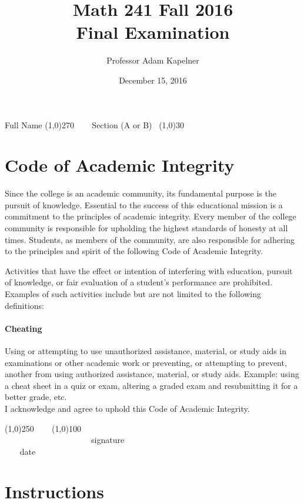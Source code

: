 \documentclass[12pt]{article}
\title{Math 241 Fall 2016 \\ Final Examination}
\author{Professor Adam Kapelner}
\date{December 15, 2016}
\begin{document}
\maketitle

\noindent Full Name \line(1,0){270} ~~~ Section (A or B)~ \line(1,0){30}

\thispagestyle{empty}

\section*{Code of Academic Integrity}

\footnotesize
Since the college is an academic community, its fundamental purpose is the pursuit of knowledge. Essential to the success of this educational mission is a commitment to the principles of academic integrity. Every member of the college community is responsible for upholding the highest standards of honesty at all times. Students, as members of the community, are also responsible for adhering to the principles and spirit of the following Code of Academic Integrity.

Activities that have the effect or intention of interfering with education, pursuit of knowledge, or fair evaluation of a student's performance are prohibited. Examples of such activities include but are not limited to the following definitions:

\paragraph{Cheating} Using or attempting to use unauthorized assistance, material, or study aids in examinations or other academic work or preventing, or attempting to prevent, another from using authorized assistance, material, or study aids. Example: using a cheat sheet in a quiz or exam, altering a graded exam and resubmitting it for a better grade, etc.
\\

\noindent I acknowledge and agree to uphold this Code of Academic Integrity. \\

\begin{center}
\line(1,0){250} ~~~ \line(1,0){100}\\
~~~~~~~~~~~~~~~~~~~~~signature~~~~~~~~~~~~~~~~~~~~~~~~~~~~~~~~~~~~~~~~~~~~~ date
\end{center}

\normalsize

\section*{Instructions}
\end{document}

